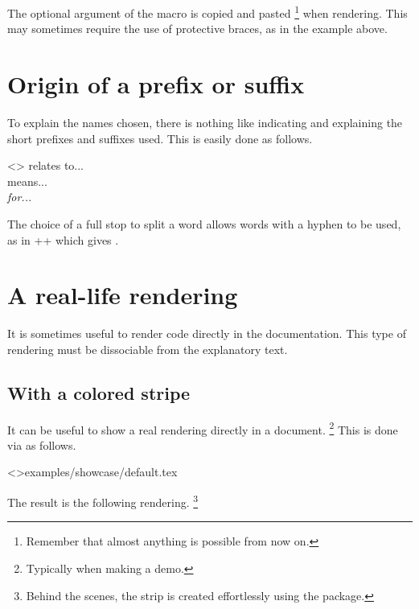 \begin{tdocwarn}
    The optional argument of the  macro is copied and pasted
    \footnote{
        Remember that almost anything is possible from now on.
    }
    when rendering. This may sometimes require the use of protective braces, as in the example above.
\end{tdocwarn}



\section{Origin of a prefix or suffix}

To explain the names chosen, there is nothing like indicating and explaining the short prefixes and suffixes used. This is easily done as follows.


\begin{tdoclatex}<>
 relates to...      \\
 means...   \\
\emph{ for...}
\end{tdoclatex}


\begin{tdocrem}
    The choice of a full stop to split a word allows words with a hyphen to be used, as in \tdoclatexin++ which gives .
\end{tdocrem}


\section{A real-life rendering}
\label{tutodoc-showcase}

It is sometimes useful to render code directly in the documentation. This type of rendering must be dissociable from the explanatory text.



\subsection{With a colored stripe}

\begin{tdocexa} 
    It can be useful to show a real rendering directly in a document.
    \footnote{
        Typically when making a demo.
    }
    This is done via  as follows.

    \tdoclatexinput<>{examples/showcase/default.tex}

    The result is the following rendering.
    \footnote{
        Behind the scenes, the strip is created effortlessly using the  package.
    }
\end{tdocexa}

